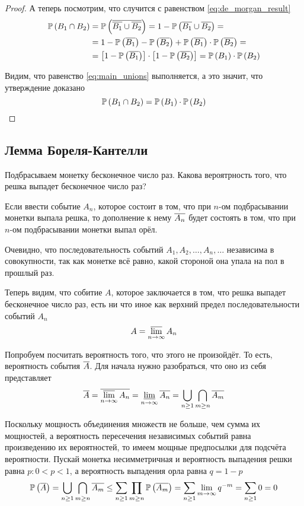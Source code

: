 \begin{proof}
    А теперь посмотрим, что случится с равенством \eqref{eq:de_morgan_result}
    \begin{align*}
        \mathbb{P}\left( B_1\cap B_2 \right)
        &=\mathbb{P}\left( \overline{\overline{B_1}\cup \overline{B_2}} \right)
        =1-\mathbb{P}\left( {\overline{B_1}\cup \overline{B_2}} \right)=\\
        &=1-\mathbb{P}\left( \overline{B_1} \right)-\mathbb{P}\left( \overline{B_2} \right)
        +\mathbb{P}\left( \overline{B_1} \right)\cdot \mathbb{P}\left( \overline{B_2} \right)=\\
        &=\left[1-\mathbb{P}\left( \overline{B_1} \right)\right]
            \cdot\left[1-\mathbb{P}\left( \overline{B_2} \right)\right]
        =\mathbb{P}\left( B_1 \right)\cdot\mathbb{P}\left( B_2 \right)
    \end{align*}

    Видим, что равенство \eqref{eq:main_unions} выполняется,
    а это значит, что утверждение доказано
    $$\mathbb{P}\left( B_1\cap B_2 \right)=\mathbb{P}\left( B_1 \right)\cdot\mathbb{P}\left( B_2 \right)$$

\end{proof}
\subsection{Лемма Бореля-Кантелли}
    Подбрасываем монетку бесконечное число раз.
    Какова вероятрность того, что решка выпадет бесконечное число раз?

    Если ввести событие $A_n$, которое состоит в том,
    что при $n$-ом подбрасывании монетки выпала решка,
    то дополнение к нему $\overline{A_n}$ будет состоять в том,
    что при $n$-ом подбрасывании монетки выпал орёл.

    Очевидно, что последовательность событий $A_1, A_2, \dots, A_n, \dots$
    независима в совокупности, так как монетке всё равно,
    какой стороной она упала на пол в прошлый раз.

    Теперь видим, что собитие $A$, которое заключается в том,
    что решка выпадет бесконечное число раз, есть ни что иное как
    верхний предел последовательности событий $A_n$
    $$A=\varlimsup\limits_{n\to\infty}A_n$$

    Попробуем посчитать вероятность того, что этого не произойдёт.
    То есть, вероятность события $\overline{A}$.
    Для начала нужно разобраться, что оно из себя представляет
    $$\overline{A}=\overline{\varlimsup\limits_{n\to\infty}A_n}
        =\varliminf\limits_{n\to\infty}\overline{A_n}
        =\bigcup_{n\ge 1}\bigcap_{m\ge n}\overline{A_m}$$

    Поскольку мощность объединения множеств не больше, чем сумма их мощностей,
    а вероятность пересечения независимых событий
    равна произведению их вероятностей,
    то имеем мощные предпосылки для подсчёта вероятности.
    Пускай монетка несимметричная и вероятность выпадения решки равна $p:0<p<1$,
    а вероятность выпадения орла равна $q=1-p$
    $$\mathbb{P}\left( \overline{A} \right)=\bigcup_{n\ge 1}\bigcap_{m\ge n}\overline{A_m}
        \le \sum_{n\ge 1} \prod_{m\ge n}\mathbb{P}\left( \overline{A_m} \right)
        =\sum_{n\ge 1}\lim\limits_{m\to\infty}q^{-m}
        =\sum_{n\ge 1} 0=0$$
    
